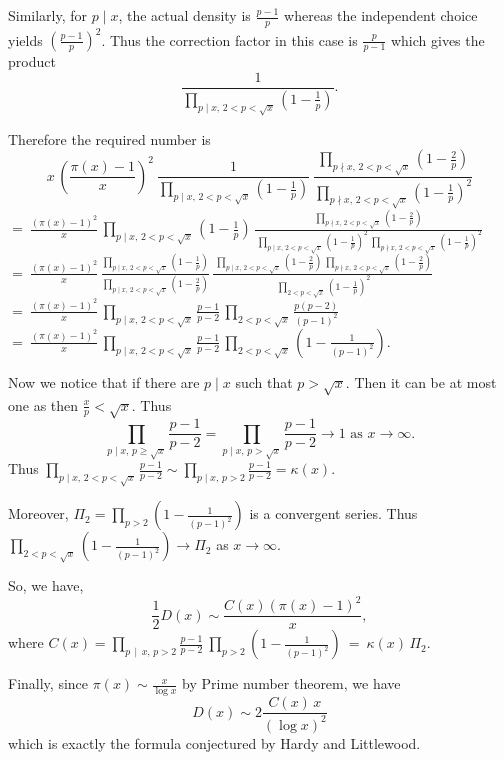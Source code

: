 \documentclass[11pt]{article}
\theoremstyle{definition}
\theoremstyle{remark}
\numberwithin{equation}{section}
\newcommand{\Div}[2]{#1\,\mid\, #2}
\begin{document}
\vspace{1em}
\noindent
Similarly, for $p\mid x$, the actual density is $\frac{p-1}{p}$ whereas the independent choice yields $\left(\frac{p-1}{p}\right)^2$. Thus the correction factor in this case is $\frac{p}{p-1}$ which gives the product 
$$\frac{1}{\prod\limits_{p\mid x,\,2<p<\sqrt{x}} \left(1-\frac{1}{p}\right)}.$$

Therefore the required number is 
$$x\,\left(\frac{\pi(x)-1}{x}\right)^2\ \frac{1}{\prod\limits_{p\mid x,\,2<p<\sqrt{x}} \left(1-\frac{1}{p}\right)}\ \frac{\prod\limits_{p\nmid x,\,2<p<\sqrt{x}} \left(1-\frac{2}{p}\right)}{\prod\limits_{p\nmid x,\,2<p<\sqrt{x}} \left(1-\frac{1}{p}\right)^2}$$
$\displaystyle{=\ \frac{(\pi(x)-1)^2}{x}\, \prod\limits_{p\mid x,\,2<p<\sqrt{x}} \left(1-\frac{1}{p}\right)\, \frac{\prod\limits_{p\nmid x,\,2<p<\sqrt{x}} \left(1-\frac{2}{p}\right)}{\, \prod\limits_{p\mid x,\,2<p<\sqrt{x}} \left(1-\frac{1}{p}\right)^2\, \prod\limits_{p\nmid x,\,2<p<\sqrt{x}} \left(1-\frac{1}{p}\right)^2}}$\\[1em]
$\displaystyle{=\ \frac{(\pi(x)-1)^2}{x}\, \frac{\prod\limits_{p\mid x,\,2<p<\sqrt{x}} \left(1-\frac{1}{p}\right)}{\prod\limits_{p\mid x,\,2<p<\sqrt{x}} \left(1-\frac{2}{p}\right)}\, \frac{\, \prod\limits_{p\mid x,\,2<p<\sqrt{x}} \left(1-\frac{2}{p}\right)\, \prod\limits_{p\nmid x,\, 2<p<\sqrt{x}} \left(1-\frac{2}{p}\right)}{\, \prod\limits_{2<p<\sqrt{x}} \left(1-\frac{1}{p}\right)^2}}$\\[1em]
$\displaystyle{=\ \frac{(\pi(x)-1)^2}{x}\, \prod\limits_{p\mid x,\,2<p<\sqrt{x}} \frac{p-1}{p-2}\,  \prod\limits_{2<p<\sqrt{x}} \frac{p(p-2)}{(p-1)^2}}$\\[1em]
$\displaystyle{=\ \frac{(\pi(x)-1)^2}{x}\, \prod\limits_{p\mid x,\,2<p<\sqrt{x}} \frac{p-1}{p-2}\, \prod\limits_{2<p<\sqrt{x}} \left(1-\frac{1}{(p-1)^2}\right)}$.

\vspace{1em}
\noindent
Now we notice that if there are $p\mid x$ such that $p>\sqrt{x}$. Then it can be at most one as then $\frac{x}{p}<\sqrt{x}$. Thus $$\prod\limits_{p\mid x,\,p\geq \sqrt{x}} \frac{p-1}{p-2} = \prod\limits_{p\mid x,\,p>\sqrt{x}} \frac{p-1}{p-2}\rightarrow 1\text{ as } x\rightarrow\infty.$$
Thus $\displaystyle{\prod\limits_{p\mid x,\,2<p<\sqrt{x}} \frac{p-1}{p-2}\sim \prod\limits_{p\mid x,\, p>2} \frac{p-1}{p-2}=\kappa(x)}$.

\vspace{1em}
\noindent
Moreover, $\Pi_2=\displaystyle{\prod\limits_{p>2} \left(1-\frac{1}{(p-1)^2}\right)}$ is a convergent series. Thus $\displaystyle{\prod\limits_{2<p<\sqrt{x}} \left(1-\frac{1}{(p-1)^2}\right)}\rightarrow \Pi_2$ as $x\rightarrow\infty$.

\vspace{1em}
\noindent
So, we have, 
$$\frac{1}{2} D(x)\sim \frac{C(x) (\pi(x)-1)^2}{x},$$ 
where $C(x)=\prod\limits_{\Div{p}{x},\, p>2} \frac{p-1}{p-2}\ \prod\limits_{p>2} \left( 1-\frac{1}{(p-1)^2}\right)\ =\ \kappa(x)\, \Pi_2$.

\vspace{1em}
Finally, since $\pi(x)\sim \frac{x}{\log x}$ by Prime number theorem, we have
$$D(x)\sim 2\frac{C(x)\, x}{(\log x)^2}$$
which is exactly the formula conjectured by Hardy and Littlewood. 
\end{document}
